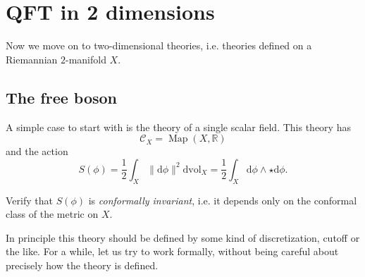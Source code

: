 \documentclass[12pt,letterpaper,reqno]{article}
\numberwithin{equation}{section}
\newcommand{\cC}{\ensuremath{\mathcal C}}
\newcommand{\R}{\ensuremath{\mathbb R}}
\newcommand{\half}{\ensuremath{\frac{1}{2}}}
\newcommand{\de}{\mathrm{d}}
\newcommand{\vol}{\mathrm{vol}}
\newcommand{\norm}[1]{\lVert#1\rVert}
\newcommand{\ti}[1]{\textit{#1}}
\DeclareMathOperator{\Map}{Map}
\newcommand{\fixme}[1]{{\color{orange}{[#1]}}}
\begin{document}
\fixme{Hilbert spaces associated to spatial slices}
\fixme{canonical quantization}


\section{QFT in 2 dimensions}

Now we move on to two-dimensional theories, i.e. theories defined
on a Riemannian $2$-manifold $X$.


\subsection{The free boson}

A simple case to start with is the theory of a single 
scalar field. This theory has
\begin{equation}
  \cC_X = \Map(X,\R)
\end{equation}
and the action
\begin{equation} \label{eq:action-2d-free-boson}
  S(\phi) = \half \int_X \norm{\de \phi}^2 \de \vol_X = \half \int_X \de \phi \wedge \star \de \phi.
\end{equation}

\begin{exercise}
Verify that $S(\phi)$ is \ti{conformally invariant}, i.e. it depends only on the conformal
class of the metric on $X$.
\end{exercise}

In principle this theory should be defined by some kind of discretization, cutoff
or the like. For a while, let us try to work formally, without being careful about
precisely how the theory is defined.
\end{document}
